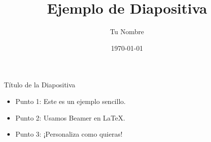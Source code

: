 \documentclass{beamer}
\title{Ejemplo de Diapositiva}
\author{Tu Nombre}
\date{\today}
\begin{document}
\begin{frame}
    \titlepage
\end{frame}

\begin{frame}{Título de la Diapositiva}
    \begin{itemize}
        \item Punto 1: Este es un ejemplo sencillo.
        \item Punto 2: Usamos Beamer en LaTeX.
        \item Punto 3: ¡Personaliza como quieras!
    \end{itemize}
\end{frame}
\end{document}
